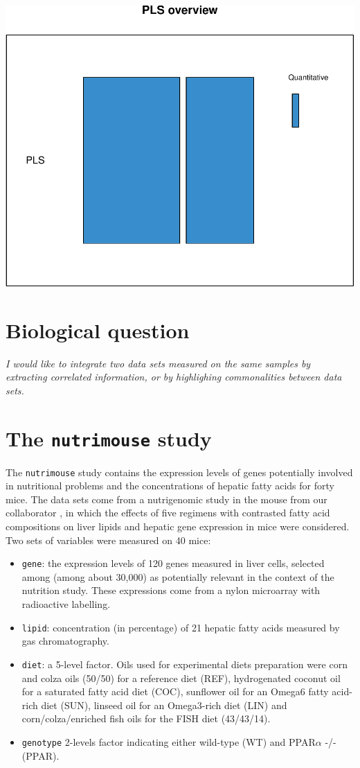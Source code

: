 \documentclass[]{book}
\begin{document}
\begin{center}\includegraphics[width=0.5\linewidth,]{Figures/05-overview-PLS-1} \end{center}

\hypertarget{biological-question-3}{%
\section{Biological question}\label{biological-question-3}}

{
\emph{I would like to integrate two data sets measured on the same samples by extracting correlated information, or by highlighing commonalities between data sets.}
}

\hypertarget{the-nutrimouse-study}{%
\section{\texorpdfstring{The \texttt{nutrimouse} study}{The nutrimouse study}}\label{the-nutrimouse-study}}

The \texttt{nutrimouse} study contains the expression levels of genes potentially involved in nutritional problems and the concentrations of hepatic fatty acids for forty mice. The data sets come from a nutrigenomic study in the mouse from our collaborator \citep{Mar07}, in which the effects of five regimens with contrasted fatty acid compositions on liver lipids and hepatic gene expression in mice were considered. Two sets of variables were measured on 40 mice:

\begin{itemize}
\item
  \texttt{gene}: the expression levels of 120 genes measured in liver cells, selected among (among about 30,000) as potentially relevant in the context of the nutrition study. These expressions come from a nylon microarray with radioactive labelling.
\item
  \texttt{lipid}: concentration (in percentage) of 21 hepatic fatty acids measured by gas chromatography.
\item
  \texttt{diet}: a 5-level factor. Oils used for experimental diets preparation were corn and colza oils (50/50) for a reference diet (REF), hydrogenated coconut oil for a saturated fatty acid diet (COC), sunflower oil for an Omega6 fatty acid-rich diet (SUN), linseed oil for an Omega3-rich diet (LIN) and corn/colza/enriched fish oils for the FISH diet (43/43/14).
\item
  \texttt{genotype} 2-levels factor indicating either wild-type (WT) and PPAR\(\alpha\) -/- (PPAR).
\end{itemize}
\end{document}

